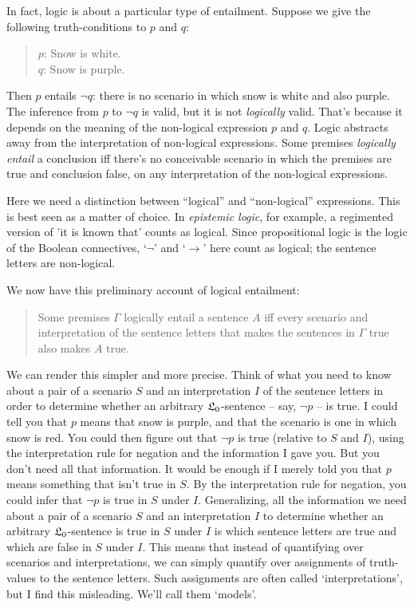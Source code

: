 In fact,
logic is about a particular type of entailment.
Suppose we give the following truth-conditions to $p$ and $q$:

\begin{quote}
   $p$: Snow is white.\\
   $q$: Snow is purple.
\end{quote}

Then $p$ entails $\neg q$:
there is no scenario in which snow is white and also purple.
The inference from $p$ to $\neg q$ is  valid,
but it is not \emph{logically} valid.
That's because it depends on the meaning of the non-logical expression $p$ and $q$.
Logic abstracts away from the interpretation of non-logical expressions.
Some premises \textit{logically entail} a conclusion iff
there's no conceivable scenario in which the premises are true and conclusion false,
on any interpretation of the non-logical expressions.

Here we need a distinction between ``logical'' and ``non-logical'' expressions.
This is best seen as a matter of choice.
In \textit{epistemic logic}, for example, a regimented version of 'it is known that' counts as logical.
Since propositional logic is the logic of the Boolean connectives, `$\neg$' and `$\to$' here count as logical;
the sentence letters are non-logical.


We now have this preliminary account of logical entailment:

\begin{quote}
  Some premises $\Gamma$ logically entail a sentence $A$ iff
  every scenario and interpretation of the sentence letters that makes the sentences in $\Gamma$ true also makes $A$ true.
\end{quote}

We can render this simpler and more precise.
Think of what you need to know
about a pair of a scenario $S$ and an interpretation $I$ of the sentence letters
in order to determine whether an arbitrary $\mathfrak{L}_0$-sentence
-- say, $\neg p$ -- is true.
I could tell you that $p$ means that snow is purple,
and that the scenario is one in which snow is red.
You could then figure out that $\neg p$ is true (relative to $S$ and $I$),
using the interpretation rule for negation and the information I gave you.
But you don't need all that information.
It would be enough if I merely told you that $p$ means something that isn't true in $S$.
By the interpretation rule for negation,
you could infer that $\neg p$ is true in $S$ under $I$.
Generalizing,
all the information we need about a pair of a scenario $S$ and an interpretation $I$
to determine whether an arbitrary $\mathfrak{L}_{0}$-sentence is true in $S$ under $I$ is
which sentence letters are true and which are false in $S$ under $I$.
This means that instead of quantifying over scenarios and interpretations,
we can simply quantify over assignments of truth-values to the sentence letters.
Such assignments are often called `interpretations',
but I find this misleading.
We'll call them `models'.

